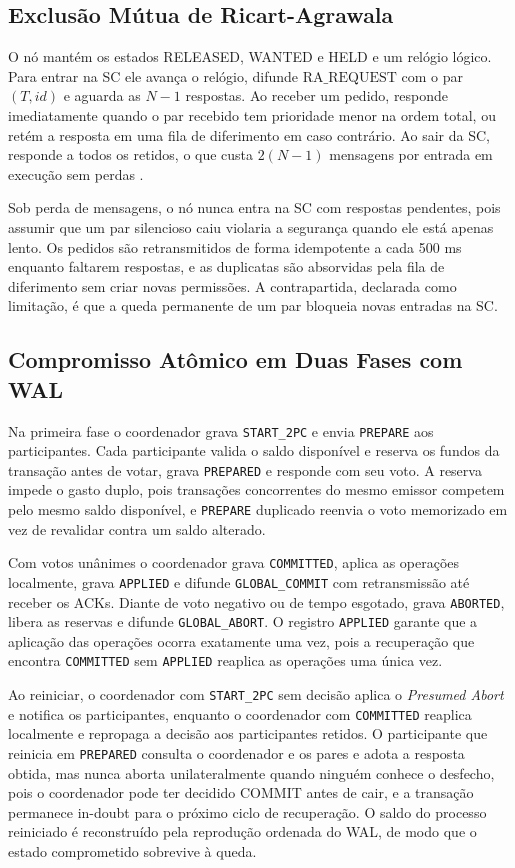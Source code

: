 \documentclass[conference]{IEEEtran}
\begin{document}
\subsection{Exclusão Mútua de Ricart-Agrawala}
O nó mantém os estados RELEASED, WANTED e HELD e um relógio lógico. Para
entrar na SC ele avança o relógio, difunde $\text{RA\_REQUEST}$ com o par
$(T, id)$ e aguarda as $N-1$ respostas. Ao receber um pedido, responde
imediatamente quando o par recebido tem prioridade menor na ordem total, ou
retém a resposta em uma fila de diferimento em caso contrário. Ao sair da SC,
responde a todos os retidos, o que custa $2(N-1)$ mensagens por entrada em
execução sem perdas \cite{ricart1981algorithm}.

Sob perda de mensagens, o nó nunca entra na SC com respostas pendentes, pois
assumir que um par silencioso caiu violaria a segurança quando ele está
apenas lento. Os pedidos são retransmitidos de forma idempotente a cada
500 ms enquanto faltarem respostas, e as duplicatas são absorvidas pela fila
de diferimento sem criar novas permissões. A contrapartida, declarada como
limitação, é que a queda permanente de um par bloqueia novas entradas na SC.

\subsection{Compromisso Atômico em Duas Fases com WAL}
Na primeira fase o coordenador grava \texttt{START\_2PC} e envia
\texttt{PREPARE} aos participantes. Cada participante valida o saldo
disponível e reserva os fundos da transação antes de votar, grava
\texttt{PREPARED} e responde com seu voto. A reserva impede o gasto duplo,
pois transações concorrentes do mesmo emissor competem pelo mesmo saldo
disponível, e \texttt{PREPARE} duplicado reenvia o voto memorizado em vez de
revalidar contra um saldo alterado.

Com votos unânimes o coordenador grava \texttt{COMMITTED}, aplica as
operações localmente, grava \texttt{APPLIED} e difunde
\texttt{GLOBAL\_COMMIT} com retransmissão até receber os ACKs. Diante de voto
negativo ou de tempo esgotado, grava \texttt{ABORTED}, libera as reservas e
difunde \texttt{GLOBAL\_ABORT}. O registro \texttt{APPLIED} garante que a
aplicação das operações ocorra exatamente uma vez, pois a recuperação que
encontra \texttt{COMMITTED} sem \texttt{APPLIED} reaplica as operações uma
única vez.

Ao reiniciar, o coordenador com \texttt{START\_2PC} sem decisão aplica o
\emph{Presumed Abort} e notifica os participantes, enquanto o coordenador com
\texttt{COMMITTED} reaplica localmente e repropaga a decisão aos
participantes retidos. O participante que reinicia em \texttt{PREPARED}
consulta o coordenador e os pares e adota a resposta obtida, mas nunca aborta
unilateralmente quando ninguém conhece o desfecho, pois o coordenador pode
ter decidido COMMIT antes de cair, e a transação permanece in-doubt para o
próximo ciclo de recuperação. O saldo do processo reiniciado é reconstruído
pela reprodução ordenada do WAL, de modo que o estado comprometido sobrevive
à queda.
\end{document}
